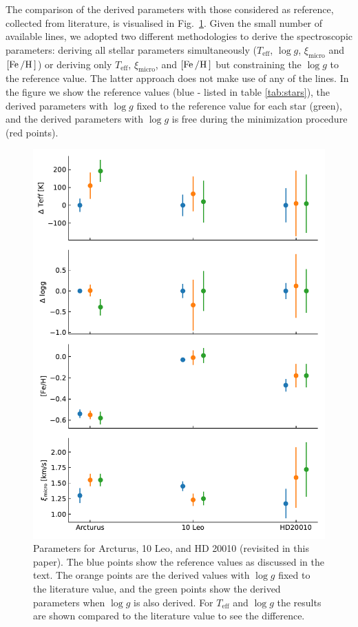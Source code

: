 \documentclass[a4paper,fleqn,usenatbib]{mnras}
\begin{document}
The comparison of the derived parameters with those considered as reference, collected from literature, is visualised in
Fig.~\ref{fig:parameters}. Given the small number of available  lines, we adopted two different
methodologies to derive the spectroscopic parameters: deriving all stellar parameters simultaneously ($T_\mathrm{eff}$, $\log g$,
$\xi_\mathrm{micro}$ and $[\ion{Fe}/\ion{H}]$) or deriving only $T_\mathrm{eff}$,
$\xi_\mathrm{micro}$, and $[\ion{Fe}/\ion{H}]$ but constraining the $\log g$ to the reference value. The
latter approach does not make use of any of the  lines.
In the figure we show the reference values (blue - listed in table \ref{tab:stars}), the 
derived parameters with $\log g$ fixed to the reference value for each star (green), and the derived parameters with $\log g$ is free during the
minimization procedure (red points).


\begin{figure}
    \centering
    \includegraphics[width=1.0\linewidth]{figures/parameters.pdf}
    \caption{Parameters for Arcturus, 10 Leo, and HD 20010 (revisited in this paper). The blue
             points show the reference values as discussed in the text. The orange points are the
             derived values with $\log g$ fixed to the literature value, and the green points show
             the derived parameters when $\log g$ is also derived. For $T_\mathrm{eff}$ and
             $\log g$ the results are shown compared to the literature value to see the difference.}
    \label{fig:parameters}
\end{figure}
\end{document}
